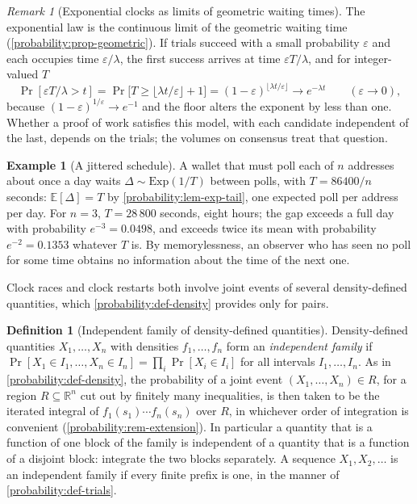 \documentclass[11pt,a4paper]{article}
\theoremstyle{definition}
\newtheorem{definition}[theorem]{Definition}
\newtheorem{example}[theorem]{Example}
\theoremstyle{remark}
\newtheorem{remark}[theorem]{Remark}
\newcommand{\R}{\ensuremath{\mathbb{R}}}
\newcommand{\E}{\ensuremath{\mathbb{E}}}
\providecommand{\floor}[1]{\lfloor #1 \rfloor}
\begin{document}
\begin{remark}[Exponential clocks as limits of geometric waiting times]
\label{probability:rem-geometric-limit}
The exponential law is the continuous limit of the geometric waiting
time (\cref{probability:prop-geometric}). If trials succeed with a
small probability \(\varepsilon\) and each occupies time
\(\varepsilon/\lambda\), the first success arrives at time
\(\varepsilon T/\lambda\), and for integer-valued \(T\)
\[
\Pr[\varepsilon T/\lambda > t]
= \Pr\bigl[T \ge \floor{\lambda t/\varepsilon} + 1\bigr]
= (1 - \varepsilon)^{\floor{\lambda t/\varepsilon}}
\longrightarrow e^{-\lambda t}
\qquad (\varepsilon \to 0) ,
\]
because \((1-\varepsilon)^{1/\varepsilon} \to e^{-1}\) and the floor
alters the exponent by less than one. Whether a proof of work
satisfies this model, with each candidate independent of the last,
depends on the trials; the volumes on consensus treat that question.
\end{remark}

\begin{example}[A jittered schedule]\label{probability:exp-jitter}
A wallet that must poll each of \(n\) addresses about once a day
waits \(\Delta \sim \mathrm{Exp}(1/T)\) between polls, with
\(T = 86400/n\) seconds: \(\E[\Delta] = T\) by
\cref{probability:lem-exp-tail}, one expected poll per address per
day. For \(n = 3\), \(T = 28\,800\) seconds, eight hours; the gap
exceeds a full day with probability \(e^{-3} = 0.0498\), and exceeds
twice its mean with probability \(e^{-2} = 0.1353\) whatever
\(T\) is. By memorylessness, an observer who has seen no poll for some
time obtains no information about the time of the next one.
\end{example}

Clock races and clock restarts both involve joint events of
several density-defined quantities, which
\cref{probability:def-density} provides only for pairs.

\begin{definition}[Independent family of density-defined quantities]
\label{probability:def-density-family}
Density-defined quantities \(X_1, \dots, X_n\) with densities
\(f_1, \dots, f_n\) form an \emph{independent family} if
\(\Pr[X_1 \in I_1, \dots, X_n \in I_n] = \prod_i \Pr[X_i \in I_i]\)
for all intervals \(I_1, \dots, I_n\). As in
\cref{probability:def-density}, the probability of a joint event
\((X_1, \dots, X_n) \in R\), for a region \(R \subseteq \R^n\) cut out
by finitely many inequalities, is then taken to be the iterated
integral of \(f_1(s_1) \cdots f_n(s_n)\) over \(R\), in whichever
order of integration is convenient (\cref{probability:rem-extension}).
In particular a quantity that is a function of one block of the
family is independent of a quantity that is a function of a disjoint
block: integrate the two blocks separately. A sequence
\(X_1, X_2, \ldots\) is an independent family if every finite prefix
is one, in the manner of \cref{probability:def-trials}.
\end{definition}
\end{document}
